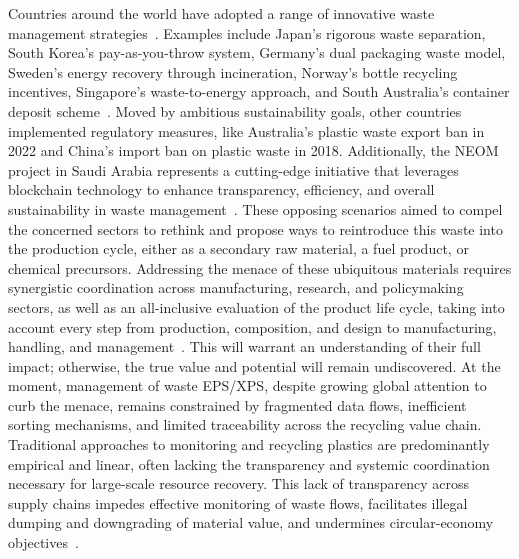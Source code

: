 \documentclass[final,5p,times,twocolumn]{elsarticle}
\begin{document}
Countries around the world have adopted a range of innovative waste management strategies~\cite{gong2022blockchain, rejeb2023blockchain}. Examples include Japan's rigorous waste separation, South Korea's pay-as-you-throw system, Germany's dual packaging waste model, Sweden's energy recovery through incineration, Norway's bottle recycling incentives, Singapore's waste-to-energy approach, and South Australia's container deposit scheme~\cite{bulkowska2024blockchain}. Moved by ambitious sustainability goals, other countries implemented regulatory measures, like Australia's plastic waste export ban in 2022 and China's import ban on plastic waste in 2018. Additionally, the NEOM project in Saudi Arabia represents a cutting-edge initiative that leverages blockchain technology to enhance transparency, efficiency, and overall sustainability in waste management~\cite{fry2024simulating, yoshida2022china}. These opposing scenarios aimed to compel the concerned sectors to rethink and propose ways to reintroduce this waste into the production cycle, either as a secondary raw material, a fuel product, or chemical precursors. Addressing the menace of these ubiquitous materials requires synergistic coordination across manufacturing, research, and policymaking sectors, as well as an all-inclusive evaluation of the product life cycle, taking into account every step from production, composition, and design to manufacturing, handling, and management~\cite{chang2020blockchain}. This will warrant an understanding of their full impact; otherwise, the true value and potential will remain undiscovered. At the moment, management of waste EPS/XPS, despite growing global attention to curb the menace, remains constrained by fragmented data flows, inefficient sorting mechanisms, and limited traceability across the recycling value chain. Traditional approaches to monitoring and recycling plastics are predominantly empirical and linear, often lacking the transparency and systemic coordination necessary for large-scale resource recovery. This lack of transparency across supply chains impedes effective monitoring of waste flows, facilitates illegal dumping and downgrading of material value, and undermines circular-economy objectives~\cite{priyana2023blockchain}.
\end{document}
